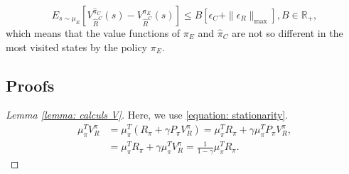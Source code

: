 \documentclass{llncs}
\newcommand{\0}{\mathbf{0}}
\newcommand{\1}{\mathbf{1}}
\begin{document}
\begin{equation}
E_{s \sim \mu_E}[V^{\hat{\pi}_C}_{\hat{R}^C}(s)-V^{\pi_E}_{\hat{R}^C}(s)]\leq B[\epsilon_C+\|\epsilon_R\|_{\text{max}}], B\in\mathbb{R}_+,
\end{equation}
which means that the value functions of $\pi_E$ and $\hat{\pi}_C$ are not so different in the most visited states by the policy $\pi_E$.

\subsection{Proofs}

\begin{proof}[Lemma \ref{lemma: calculs V}]
Here, we use \eqref{equation: stationarity}.
\begin{align}
\mu_\pi^TV^\pi_R&=\mu_\pi^T(R_\pi+\gamma P_\pi V^\pi_R)=\mu_\pi^TR_\pi+ \gamma\mu_\pi^TP_\pi V^\pi_R,
\\
&=\mu_\pi^TR_\pi+ \gamma\mu_\pi^TV^\pi_R=\frac{1}{1-\gamma}\mu_\pi^TR_\pi.
\end{align}
\end{proof}

\end{document}
